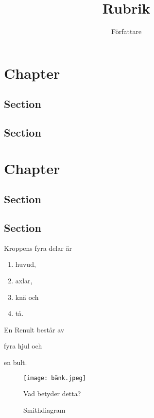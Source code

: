 \documentclass[a4paper, article]{memoir}
\title{Rubrik}
\author{Författare}
\begin{document}
\maketitle

\chapter{Chapter}
\section{Section}
\section{Section}

\chapter{Chapter}
\section{Section}
\section{Section}

Kroppens fyra delar är
\begin{enumerate}
\item huvud,
\item axlar,
\item knä och
\item tå.
\end{enumerate}
En Renult består av
\begin{enumerate*}[label=(\alph*)]
\item fyra hjul och
\item en bult.
\end{enumerate*}

\begin{figure}[ht]
\centering
\texttt{[image: bänk.jpeg]}
\caption{Vad betyder detta?}
\label{fig:bänk}
\end{figure}

\begin{figure}[ht]
\centering

\caption{Smithdiagram}
\label{fig:smith}
\end{figure}
\end{document}
